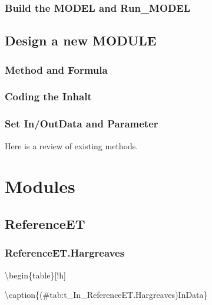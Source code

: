\documentclass[
]{book}
\begin{document}
\hypertarget{build-the-model-and-run_model}{%
\subsection{Build the MODEL and Run\_MODEL}\label{build-the-model-and-run_model}}

\hypertarget{design-a-new-module}{%
\section{Design a new MODULE}\label{design-a-new-module}}

\hypertarget{method-and-formula}{%
\subsection{Method and Formula}\label{method-and-formula}}

\hypertarget{coding-the-inhalt}{%
\subsection{Coding the Inhalt}\label{coding-the-inhalt}}

\hypertarget{set-inoutdata-and-parameter}{%
\subsection{Set In/OutData and Parameter}\label{set-inoutdata-and-parameter}}

Here is a review of existing methods.

\hypertarget{module}{%
\chapter{Modules}\label{module}}

\hypertarget{referenceet}{%
\section{ReferenceET}\label{referenceet}}

\hypertarget{referenceet.hargreaves}{%
\subsection{ReferenceET.Hargreaves}\label{referenceet.hargreaves}}

\textbackslash begin\{table\}{[}!h{]}

\textbackslash caption\{(\#tab:t\_In\_ReferenceET.Hargreaves)InData\}
\centering
\end{document}
